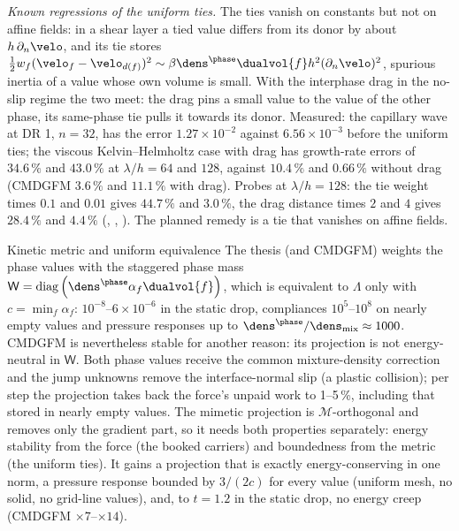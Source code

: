 \emph{Known regressions of the uniform ties.} The ties vanish on constants but
not on affine fields: in a shear layer a tied value differs from its donor by
about $h\,\partial_n\velo$, and its tie stores
$\tfrac12w_f(\velo_f-\velo_{d(f)})^2\sim\beta\dens^{\phase}\dualvol{f}h^2(\partial_n\velo)^2$,
spurious inertia of a value whose own volume is small. With the interphase
drag in the no-slip regime the two meet: the drag pins a small value to the
value of the other phase, its same-phase tie pulls it towards its donor.
Measured: the capillary wave at DR 1, $n=32$, has the error
$1.27\times10^{-2}$ against $6.56\times10^{-3}$ before the uniform ties; the
viscous Kelvin--Helmholtz case  with drag has growth-rate errors
of $34.6\,\%$ and $43.0\,\%$ at $\lambda/h=64$ and $128$, against $10.4\,\%$ and
$0.66\,\%$ without drag (CMDGFM $3.6\,\%$ and $11.1\,\%$ with drag). Probes at
$\lambda/h=128$: the tie weight times $0.1$ and $0.01$ gives $44.7\,\%$ and
$3.0\,\%$, the drag distance times $2$ and $4$ gives $28.4\,\%$ and $4.4\,\%$
(, , ). The planned
remedy is a tie that vanishes on affine fields.

\begin{deviation}{Kinetic metric and uniform equivalence}\label{dev:projection:uniform-equivalence}
The thesis (and CMDGFM) weights the phase values with the staggered phase mass
$\mathsf W=\diag{\dens^{\phase}\alpha_f\dualvol{f}}$, which is equivalent to
$\Lambda$ only with $c=\min_f\alpha_f$: $10^{-8}$--$6\times10^{-6}$ in the static
drop, compliances $10^5$--$10^8$ on nearly empty values and pressure responses
up to $\dens^{\phase}/\dens_{\mathrm{mix}}\approx1000$. CMDGFM is nevertheless
stable for another reason: its projection is not energy-neutral in
$\mathsf W$. Both phase values receive the common mixture-density correction
and the jump unknowns remove the interface-normal slip (a plastic collision);
per step the projection takes back the force's unpaid work to 1--5\,\%,
including that stored in nearly empty values. The mimetic projection is
$\mathcal M$-orthogonal and removes only the gradient part, so it needs both
properties separately: energy stability from the force (the booked carriers)
and boundedness from the metric (the uniform ties). It gains a projection that
is exactly energy-conserving in one norm, a pressure response bounded by
$3/(2c)$ for every value (uniform mesh, no solid, no grid-line values), and, to $t=1.2$ in the static drop, no energy creep
(CMDGFM $\times7$--$\times14$).
\end{deviation}

